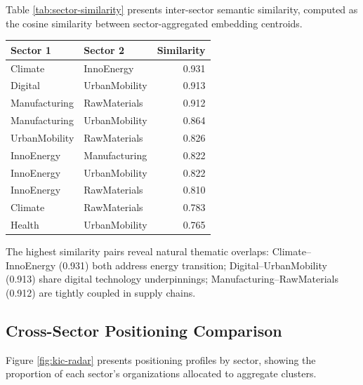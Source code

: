 \documentclass[../main.tex]{subfiles}
\begin{document}
Table \ref{tab:sector-similarity} presents inter-sector semantic similarity, computed as the cosine similarity between sector-aggregated embedding centroids.

\begin{center}
\small
\begin{tabular}{llr}
\toprule
\textbf{Sector 1} & \textbf{Sector 2} & \textbf{Similarity} \\
\midrule
Climate & InnoEnergy & 0.931 \\
Digital & UrbanMobility & 0.913 \\
Manufacturing & RawMaterials & 0.912 \\
Manufacturing & UrbanMobility & 0.864 \\
UrbanMobility & RawMaterials & 0.826 \\
InnoEnergy & Manufacturing & 0.822 \\
InnoEnergy & UrbanMobility & 0.822 \\
InnoEnergy & RawMaterials & 0.810 \\
Climate & RawMaterials & 0.783 \\
Health & UrbanMobility & 0.765 \\
\bottomrule
\end{tabular}
\end{center}

The highest similarity pairs reveal natural thematic overlaps: Climate--InnoEnergy (0.931) both address energy transition; Digital--UrbanMobility (0.913) share digital technology underpinnings; Manufacturing--RawMaterials (0.912) are tightly coupled in supply chains.

\subsection{Cross-Sector Positioning Comparison}

Figure \ref{fig:kic-radar} presents positioning profiles by sector, showing the proportion of each sector's organizations allocated to aggregate clusters.
\end{document}
